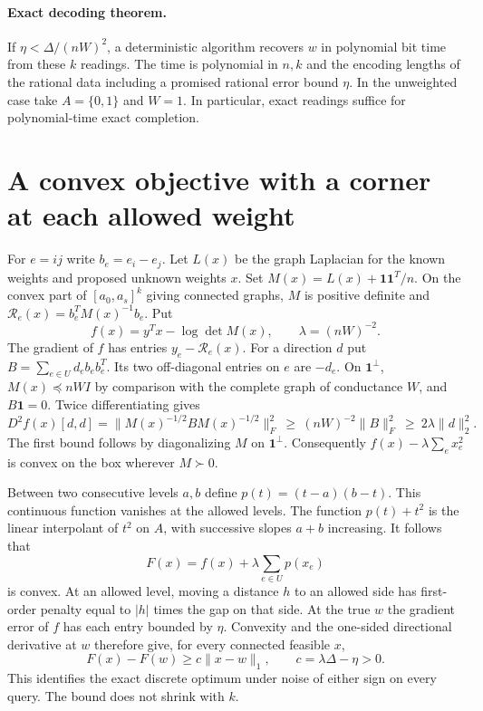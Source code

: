\documentclass[11pt]{article}
\newcommand{\one}{\mathbf 1}
\newcommand{\res}{\mathcal R}
\begin{document}
\paragraph{Exact decoding theorem.}
If $\eta<\Delta/(nW)^2$, a deterministic algorithm recovers $w$ in polynomial bit time from these $k$ readings. The time is polynomial in $n,k$ and the encoding lengths of the rational data including a promised rational error bound $\eta$. In the unweighted case take $A=\{0,1\}$ and $W=1$. In particular, exact readings suffice for polynomial-time exact completion.

\section*{A convex objective with a corner at each allowed weight}
For $e=ij$ write $b_e=e_i-e_j$. Let $L(x)$ be the graph Laplacian for the known weights and proposed unknown weights $x$. Set $M(x)=L(x)+\one\one^T/n$. On the convex part of $[a_0,a_s]^k$ giving connected graphs, $M$ is positive definite and $\res_e(x)=b_e^TM(x)^{-1}b_e$. Put
\[
 f(x)=y^T x-\log\det M(x),\qquad \lambda=(nW)^{-2}.
\]
The gradient of $f$ has entries $y_e-\res_e(x)$. For a direction $d$ put $B=\sum_{e\in U}d_eb_eb_e^T$. Its two off-diagonal entries on $e$ are $-d_e$. On $\one^\perp$, $M(x)\preceq nW I$ by comparison with the complete graph of conductance $W$, and $B\one=0$. Twice differentiating gives
\[
 D^2f(x)[d,d]=\|M(x)^{-1/2} B M(x)^{-1/2}\|_F^2
 \ \ge\ (nW)^{-2}\|B\|_F^2\ \ge\ 2\lambda\|d\|_2^2 .
\]
The first bound follows by diagonalizing $M$ on $\one^\perp$. Consequently $f(x)-\lambda\sum_e x_e^2$ is convex on the box wherever $M\succ0$.

Between two consecutive levels $a,b$ define $p(t)=(t-a)(b-t)$. This continuous function vanishes at the allowed levels. The function $p(t)+t^2$ is the linear interpolant of $t^2$ on $A$, with successive slopes $a+b$ increasing. It follows that
\[
                 F(x)=f(x)+\lambda\sum_{e\in U}p(x_e)
\]
is convex. At an allowed level, moving a distance $h$ to an allowed side has first-order penalty equal to $|h|$ times the gap on that side. At the true $w$ the gradient error of $f$ has each entry bounded by $\eta$. Convexity and the one-sided directional derivative at $w$ therefore give, for every connected feasible $x$,
\[
               F(x)-F(w)\ge c\|x-w\|_1,\qquad c=\lambda\Delta-\eta>0. \tag{1}
\]
This identifies the exact discrete optimum under noise of either sign on every query. The bound does not shrink with $k$.
\end{document}
